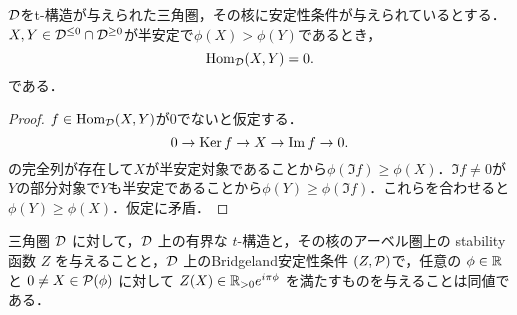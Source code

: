 \begin{lemm}\cite{Bri07}\label{lemm:Hom is 0}
	$\D$をt-構造が与えられた三角圏，その核に安定性条件が与えられているとする．$X,Y\in\D^{\le 0}\cap\D^{\ge 0}$が半安定で$\phi(X)>\phi(Y)$であるとき，
	\[\Hom_{\D}(X,Y)=0.\]
	である．
\end{lemm}
\begin{proof}
	$f\in\Hom_{\D}(X,Y)$が$0$でないと仮定する．
	\[0\rightarrow\Ker f\rightarrow X \rightarrow \Im f \rightarrow 0.\]
	の完全列が存在して$X$が半安定対象であることから$\phi(\Im f)\ge\phi(X)$．$\Im f\neq 0$が$Y$の部分対象で$Y$も半安定であることから$\phi(Y)\ge\phi(\Im f)$．これらを合わせると$\phi(Y)\ge\phi(X)$．仮定に矛盾．
\end{proof}

\begin{prop}\cite{Bri07}
三角圏 $\D$ に対して，$\D$ 上の有界な $t$-構造と，その核のアーベル圏上の stability函数 $Z$ を与えることと，$\D$ 上のBridgeland安定性条件 $(Z, \P)$で，任意の $\phi \in \RR$ と $0 \neq X \in \P(\phi)$ に対して $Z(X) \in \RR_{>0} e^{i\pi\phi}$ を満たすものを与えることは同値である．
\end{prop}

